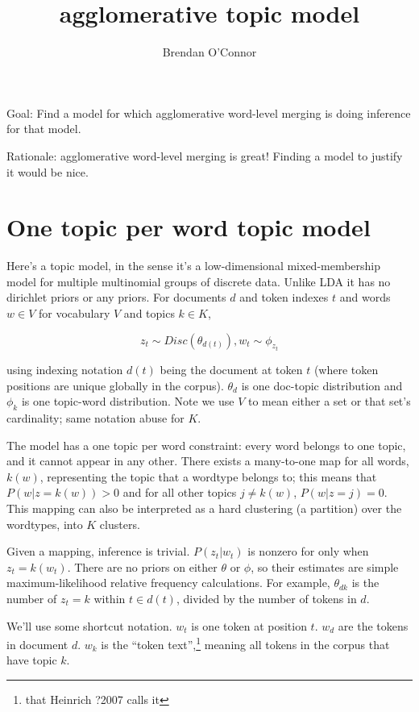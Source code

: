\documentclass[11pt,letterpaper]{article}
\title{agglomerative topic model
}
\author{
Brendan O'Connor 
}
\theoremstyle{definition}
\begin{document}
\maketitle

Goal: Find a model for which agglomerative word-level merging is doing inference for that model.

Rationale: agglomerative word-level merging is great!  Finding a model to justify it would be nice.

\section{One topic per word topic model}

Here's a topic model, in the sense it's a low-dimensional mixed-membership model for multiple multinomial groups of discrete data.  Unlike LDA it has no dirichlet priors or any priors.  For documents $d$ and token indexes $t$ and words $w \in V$ for vocabulary $V$ and topics $k \in K$,

\[ z_t \sim Disc(\theta_{d(t)}), w_t \sim \phi_{z_t} \]

using indexing notation $d(t)$ being the document at token $t$ (where token positions are unique globally in the corpus).  $\theta_d$ is one doc-topic distribution and $\phi_k$ is one topic-word distribution.  Note we use $V$ to mean either a set or that set's cardinality; same notation abuse for $K$.

The model has a one topic per word constraint: every word belongs to one topic, and it cannot appear in any other.  There exists a many-to-one map for all words, $k(w)$, representing the topic that a wordtype belongs to; this means that $P(w|z=k(w))>0$ and for all other topics $j \neq k(w)$, $P(w|z=j)=0$.
This mapping can also be interpreted as a hard clustering (a partition) over the wordtypes, into $K$ clusters.

Given a mapping, inference is trivial.  $P(z_t|w_t)$ is nonzero for only when $z_t=k(w_t)$.  There are no priors on either $\theta$ or $\phi$, so their estimates are simple maximum-likelihood relative frequency calculations.  For example, $\theta_{dk}$ is the number of $z_t=k$ within $t \in d(t)$, divided by the number of tokens in $d$.

We'll use some shortcut notation.  $w_t$ is one token at position $t$.  $w_d$ are the tokens in document $d$.  $w_k$ is the ``token text'',\footnote{that Heinrich ?2007 calls it} meaning all tokens in the corpus that have topic $k$.
\end{document}

